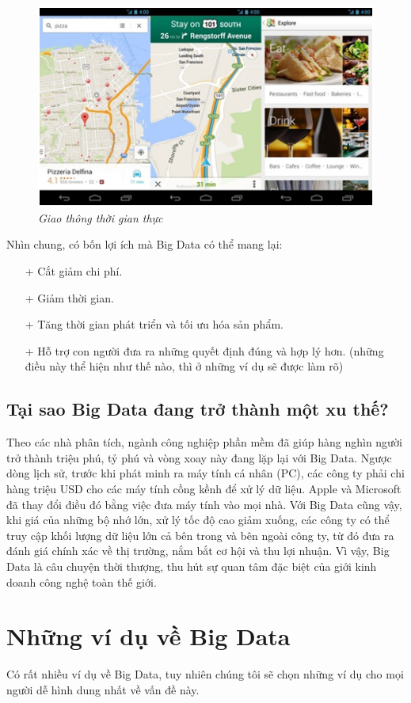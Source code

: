 \documentclass[12pt]{report}
\begin{document}
\begin{figure}[H]
\centering
\includegraphics[scale=1]{util.png}
\caption{\it Giao thông thời gian thực}
\end{figure}
Nhìn chung, có bốn lợi ích mà Big Data có thể mang lại: 
\begin{itemize}
	\item[+] Cắt giảm chi phí.
	\item[+] Giảm thời gian.
	\item[+] Tăng thời gian phát triển và tối ưu hóa sản phẩm.
	\item[+] Hỗ trợ con người đưa ra những quyết định đúng và hợp lý hơn. (những điều này thể hiện như thế nào, thì ở những ví dụ sẽ được làm rõ)
\end{itemize}

\subsection{Tại sao Big Data đang trở thành một xu thế?}
Theo các nhà phân tích, ngành công nghiệp phần mềm đã giúp hàng nghìn người trở thành triệu phú, tỷ phú và vòng xoay này đang lặp lại với Big Data. Ngược dòng lịch sử, trước khi phát minh ra máy tính cá nhân (PC), các công ty phải chi hàng triệu USD cho các máy tính cồng kềnh để xử lý dữ liệu. Apple và Microsoft đã thay đổi điều đó bằng việc đưa máy tính vào mọi nhà. Với Big Data cũng vậy, khi giá của những bộ nhớ lớn, xử lý tốc độ cao giảm xuống, các công ty có thể truy cập khối lượng dữ liệu lớn cả bên trong và bên ngoài công ty, từ đó đưa ra đánh giá chính xác về thị trường, nắm bắt cơ hội và thu lợi nhuận.  Vì vậy, Big Data là câu chuyện thời thượng, thu hút sự quan tâm đặc biệt của giới kinh doanh công nghệ toàn thế giới.

\section{Những ví dụ về Big Data}
Có rất nhiều ví dụ về Big Data, tuy nhiên chúng tôi sẽ chọn những ví dụ cho mọi người dễ hình dung nhất về vấn đề này.
\end{document}
